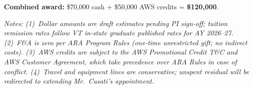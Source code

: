 \documentclass[11pt]{article}
\begin{document}
\vspace{0.4em}

\noindent\textbf{Combined award:} \$70{,}000 cash + \$50{,}000 AWS credits = \textbf{\$120{,}000}.

\vspace{0.5em}

\footnotesize\textit{Notes: (1)~Dollar amounts are draft estimates pending PI sign-off; tuition remission rates follow VT in-state graduate published rates for AY 2026--27. (2)~F\&A is zero per ARA Program Rules (one-time unrestricted gift; no indirect costs). (3)~AWS credits are subject to the AWS Promotional Credit T\&C and AWS Customer Agreement, which take precedence over ARA Rules in case of conflict. (4)~Travel and equipment lines are conservative; unspent residual will be redirected to extending Mr.~Cusati's appointment.}
\end{document}
